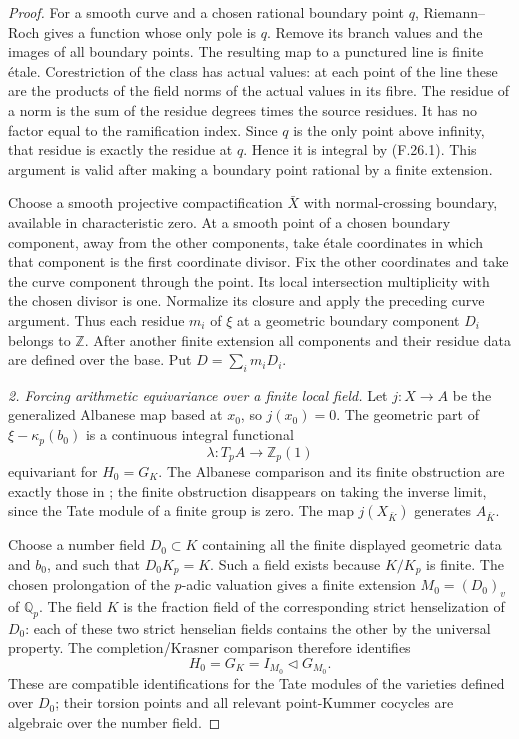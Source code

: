 \documentclass[11pt]{article}
\begin{document}
\begin{proof}
For a smooth curve and a chosen rational boundary point
\(q\), Riemann--Roch gives a function whose only pole
is \(q\). Remove its branch values and the images of
all boundary points. The resulting map to a punctured
line is finite \'etale. Corestriction of the class has
actual values: at each point of the line these are the
products of the field norms of the actual values in its
fibre. The residue of a norm is the sum of the residue
degrees times the source residues. It has no factor
equal to the ramification index. Since \(q\) is the
only point above infinity, that residue is exactly
the residue at \(q\). Hence it is integral by (F.26.1).
This argument is valid after making a boundary point
rational by a finite extension.

Choose a smooth projective compactification \(\bar X\)
with normal-crossing boundary, available in characteristic
zero. At a smooth point of a chosen boundary component,
away from the other components, take \'etale coordinates
in which that component is the first coordinate divisor.
Fix the other coordinates and take the curve component
through the point. Its local intersection multiplicity
with the chosen divisor is one. Normalize its closure
and apply the preceding curve argument. Thus each residue
\(m_i\) of \(\xi\) at a geometric boundary component
\(D_i\) belongs to \(\mathbb Z\). After another finite
extension all components and their residue data are defined
over the base. Put \(D=\sum_i m_iD_i\).

\emph{2. Forcing arithmetic equivariance over a finite local field.}
Let \(j:X\to A\) be the generalized Albanese map based
at \(x_0\), so \(j(x_0)=0\). The geometric part of
\(\xi-\kappa_p(b_0)\) is a continuous integral functional
\[
                  \lambda:T_pA\longrightarrow\mathbb Z_p(1)
\]
equivariant for \(H_0=G_K\). The Albanese comparison and
its finite obstruction are exactly those in
\citet[Proposition~4.1 and Corollary~4.2]{FF_SpiessSzamuely2003};
the finite obstruction disappears on taking the inverse
limit, since the Tate module of a finite group is zero.
The map \(j(X_{\bar K})\) generates \(A_{\bar K}\).

Choose a number field \(D_0\subset K\) containing all
the finite displayed geometric data and \(b_0\), and
such that \(D_0K_p=K\). Such a field exists because
\(K/K_p\) is finite. The chosen prolongation of the
\(p\)-adic valuation gives a finite extension
\(M_0=(D_0)_v\) of \(\mathbb Q_p\). The field \(K\)
is the fraction field of the corresponding strict
henselization of \(D_0\): each of these two strict
henselian fields contains the other by the universal
property. The completion/Krasner comparison therefore
identifies
\[
                  H_0=G_K=I_{M_0}\triangleleft G_{M_0}.
                                                               \tag{F.26.2}
\]
These are compatible identifications for the Tate modules
of the varieties defined over \(D_0\); their torsion
points and all relevant point-Kummer cocycles are algebraic
over the number field.


\end{proof}
\end{document}

